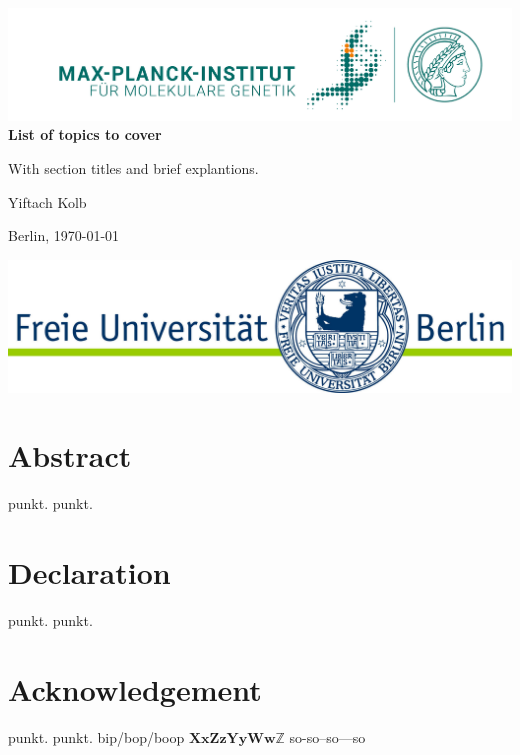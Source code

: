 \documentclass[11pt, a4paper]{report}
\theoremstyle{plain}
\theoremstyle{definition}
\theoremstyle{remark}
\newcommand{\X}{\mathbf{X}}
\newcommand{\x}{\mathbf{x}}
\newcommand{\Z}{\mathbf{Z}}
\newcommand{\z}{\mathbf{z}}
\newcommand{\Y}{\mathbf{Y}}
\newcommand{\y}{\mathbf{y}}
\newcommand{\W}{\mathbf{W}}
\newcommand{\w}{\mathbf{w}}
\begin{document}
\begin{titlepage}
\begin{center}
{\includegraphics{images/MPIMG_RGB_gruen.png}}\\
\vspace*{1cm}
\Large
\textbf{List of topics to cover}



\large
With section titles and brief explantions.
\vfill

Yiftach Kolb

Berlin, \today

\vfill
{\includegraphics{images/fu-logo_bildschirm_RGB1.jpg}}
\end{center}
\end{titlepage}


\chapter*{Abstract}
punkt.
punkt.
\nocite{guo2017improved}

\chapter*{Declaration}
punkt.
punkt.
\nocite{bishop2006pattern}
\nocite{serre2001matrices}
\nocite{kingma2013auto}
\nocite{lotfollahi2018generative}
\nocite{luecken2019current}

\chapter*{Acknowledgement}
punkt.\cite{kingma2013auto}
punkt.
bip/bop\slash boop
$\X \x \Z \z \Y \y \W \w \mathbb{Z}$
so-so--so---so
\end{document}
